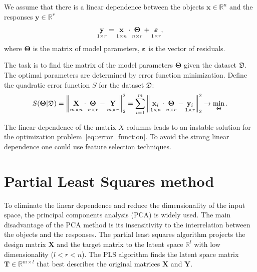 \documentclass[preprint,12pt]{elsarticle}
\newcommand{\bx}{\mathbf{x}}
\newcommand{\by}{\mathbf{y}}
\newcommand{\bY}{\mathbf{Y}}
\newcommand{\bX}{\mathbf{X}}
\newcommand{\bT}{\mathbf{T}}
\newcommand{\bTheta}{\boldsymbol{\Theta}}
\begin{document}
We assume that there is a linear dependence between the objects $\bx \in \mathbb{R}^n$ and the responses $\by \in \mathbb{R}^r$
\begin{equation}
\underset{1 \times r}{\by} = \underset{1 \times n}{\vphantom{\by}\bx} \cdot \underset{n \times r}{\vphantom{\by}\bTheta} + \underset{1 \times r}{\vphantom{\by}\boldsymbol{\varepsilon}}, 
\label{eq::model}
\end{equation}
where $\bTheta$ is the matrix of model parameters, $\boldsymbol{\varepsilon}$ is the vector of residuals.

The task is to find the matrix of the model parameters $\bTheta$ given the dataset $\mathfrak{D}$.
The optimal parameters are determined by error function minimization. 
Define the quadratic error function $S$ for the dataset $\mathfrak{D}$:
\begin{equation}
S(\bTheta | \mathfrak{D}) = {\left\| \underset{m \times n}{\vphantom{\by}\mathbf{X}} \cdot \underset{n \times r}{\vphantom{\by}\bTheta} - \underset{m \times r}{\vphantom{\by}\mathbf{Y}} \right\| }_2^2 = \sum_{i=1}^m \left\| \underset{1 \times n}{\vphantom{\by}\bx_i} \cdot \underset{n \times r}{\vphantom{\by}\bTheta} - \underset{1 \times r}{\vphantom{\by}\by_i} \right\|_2^2 \rightarrow\min_{\bTheta}.
\label{eq::error_function}
\end{equation}
 
The linear dependence of the matrix $X$ columns leads to an instable solution for the optimization problem~\eqref{eq::error_function}. 
To avoid the strong linear dependence one could use feature selection techniques.
\section{Partial Least Squares method}

To eliminate the linear dependence and reduce the dimensionality of the input space, the principal components analysis (PCA) is widely used. 
The main disadvantage of the PCA method is its insensitivity to the interrelation between the objects and the responses.
The partial least squares algorithm projects the design matrix $\bX$ and the target matrix to the latent space $\mathbb{R}^l$ with low dimensionality ($l < r < n$).
The PLS algorithm finds the latent space matrix $\bT \in \mathbb{R}^{m \times l}$ that best describes the original matrices $\bX$ and $\bY$.
\end{document}
